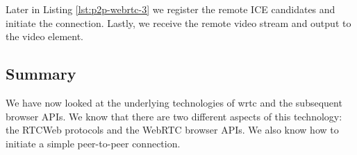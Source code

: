 Later in Listing \ref{lst:p2p-webrtc-3} we register the remote ICE candidates and initiate the connection. Lastly, we receive the remote video stream and output to the video element.

\subsection{Summary}
We have now looked at the underlying technologies of \gls{wrtc} and the subsequent browser APIs. We know that there are two different aspects of this technology: the RTCWeb protocols and the WebRTC browser APIs. We also know how to initiate a simple peer-to-peer connection.